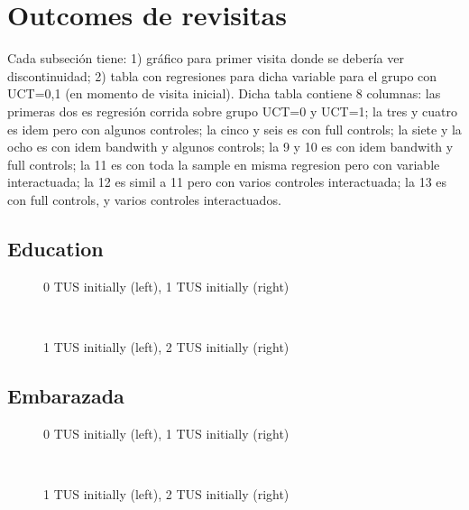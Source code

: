 \documentclass[12pt]{article}
\begin{document}
\section{Outcomes de revisitas}

Cada subseción tiene: 1) gráfico para primer visita donde se debería ver discontinuidad; 2) tabla con regresiones para dicha variable para el grupo con UCT=0,1 (en momento de visita inicial). Dicha tabla contiene 8 columnas: las primeras dos es regresión corrida sobre grupo UCT=0 y UCT=1; la tres y cuatro es idem pero con algunos controles; la cinco y seis es con full controls; la siete y la ocho es con idem bandwith y algunos controls; la 9 y 10 es con idem bandwith y full controls; la 11 es con toda la sample en misma regresion pero con variable interactuada; la 12 es simil a 11 pero con varios controles interactuada; la 13 es con full controls, y varios controles interactuados.

\subsection{Education}
\begin{figure}[H]%
	\centering
	\caption*{0 TUS initially (left), 1 TUS initially (right)}
	 \quad 
	 \\
	
	\caption*{1 TUS initially (left), 2 TUS initially (right)}
	 \qquad
	\label{fig:asisteEscuelaTwo}%
\end{figure}

\subsection{Embarazada}
\begin{figure}[H]%
	\centering
	\caption*{0 TUS initially (left), 1 TUS initially (right)}
	 \quad 
	 \\
	
	\caption*{1 TUS initially (left), 2 TUS initially (right)}
	 \qquad
	\label{fig:embarazadaTwo}%
\end{figure}
\end{document}
